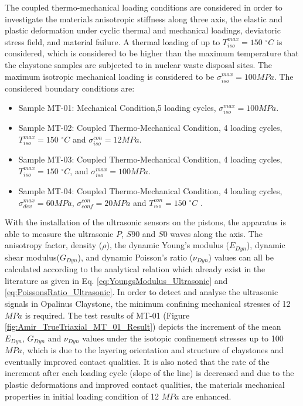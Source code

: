 The coupled thermo-mechanical loading conditions are considered in order to investigate the materials anisotropic stiffness along three axis, the elastic and plastic deformation under cyclic thermal and mechanical loadings, deviatoric stress field, and material failure. A thermal loading of up to $T_{iso}^{max}=150$ $^{\circ}C$ is considered, which is considered to be higher than the maximum temperature that the claystone samples are subjected to in nuclear waste disposal sites. The maximum isotropic mechanical loading is considered to be $\sigma_{iso}^{max}=100 MPa$. The considered boundary conditions are:


\begin{itemize}
  \item Sample MT-01: Mechanical Condition,5 loading cycles, $\sigma_{iso}^{max}=100 MPa$.
  \item Sample MT-02: Coupled Thermo-Mechanical Condition, 4 loading cycles, $T_{iso}^{max}=150$ $^{\circ}C$ and $\sigma_{iso}^{con}=12 MPa$.
  \item Sample MT-03: Coupled Thermo-Mechanical Condition, 4 loading cycles, $T_{iso}^{max}=150$ $^{\circ}C$, and $\sigma_{iso}^{max}=100 MPa$.
  \item Sample MT-04: Coupled Thermo-Mechanical Condition, 4 loading cycles, $\sigma_{dev}^{max}=60 MPa$, $\sigma_{conf}^{con}= 20 MPa$ and $T_{iso}^{con}=150$ $^{\circ}C$ .
\end{itemize}


With the installation of the ultrasonic sensors on the pistons, the apparatus is able to measure the ultrasonic $P$, $S90$ and $S0$ waves along the axis. The anisotropy factor, density ($\rho$), the dynamic Young’s modulus ($E_{Dyn}$), dynamic shear modulus($G_{Dyn}$), and dynamic Poisson’s ratio ($\nu_{Dyn}$) values can all be calculated according to the analytical relation which already exist in the literature \cite{Motraetal2018} as given in Eq. \ref{eq:YoungsModulus_Ultrasonic} and \ref{eq:PoissonsRatio_Ultrasonic}. In order to detect and analyse the ultrasonic signals in Opalinus Claystone, the minimum confining mechanical stresses of 12 $MPa$ is required. The test results of MT-01 (Figure \ref{fig:Amir_TrueTriaxial_MT_01_Result}) depicts the increment of the mean $E_{Dyn}$, $G_{Dyn}$ and $\nu_{Dyn}$ values under the isotopic confinement stresses up to 100 $MPa$, which is due to the layering orientation and structure of claystones and eventually improved contact qualities. It is also noted that the rate of the increment after each loading cycle (slope of the line) is decreased and due to the plastic deformations and improved contact qualities, the materials mechanical properties in initial loading condition of 12 $MPa$ are enhanced. 


